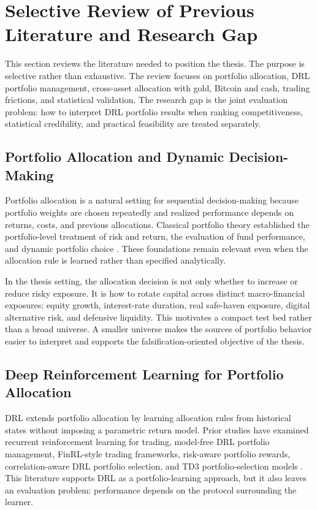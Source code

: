 \documentclass[12pt]{article}
\begin{document}
\newpage

\section{Selective Review of Previous Literature and Research Gap}

This section reviews the literature needed to position the thesis. The purpose is selective rather than exhaustive. The review focuses on portfolio allocation, DRL portfolio management, cross-asset allocation with gold, Bitcoin and cash, trading frictions, and statistical validation. The research gap is the joint evaluation problem: how to interpret DRL portfolio results when ranking competitiveness, statistical credibility, and practical feasibility are treated separately.

\subsection{Portfolio Allocation and Dynamic Decision-Making}

Portfolio allocation is a natural setting for sequential decision-making because portfolio weights are chosen repeatedly and realized performance depends on returns, costs, and previous allocations. Classical portfolio theory established the portfolio-level treatment of risk and return, the evaluation of fund performance, and dynamic portfolio choice \citep{markowitz1952,sharpe1966,merton1969,merton1971}. These foundations remain relevant even when the allocation rule is learned rather than specified analytically.

In the thesis setting, the allocation decision is not only whether to increase or reduce risky exposure. It is how to rotate capital across distinct macro-financial exposures: equity growth, interest-rate duration, real safe-haven exposure, digital alternative risk, and defensive liquidity. This motivates a compact test bed rather than a broad universe. A smaller universe makes the sources of portfolio behavior easier to interpret and supports the falsification-oriented objective of the thesis.

\subsection{Deep Reinforcement Learning for Portfolio Allocation}

DRL extends portfolio allocation by learning allocation rules from historical states without imposing a parametric return model. Prior studies have examined recurrent reinforcement learning for trading, model-free DRL portfolio management, FinRL-style trading frameworks, risk-aware portfolio rewards, correlation-aware DRL portfolio selection, and TD3 portfolio-selection models \citep{moody2001,jiang2017,almahdi2017,liu2020finrl,zhao2023correlation,jiang2024td3,jiang2025multiperiod}. This literature supports DRL as a portfolio-learning approach, but it also leaves an evaluation problem: performance depends on the protocol surrounding the learner.
\end{document}
